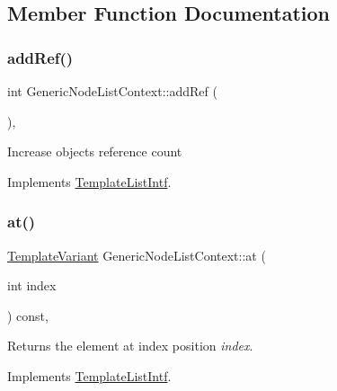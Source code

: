 \subsection{Member Function Documentation}
\mbox{\label{class_generic_node_list_context_a8c165d6443a3f2522cd6a871ce45ebc4}} 
\subsubsection{\texorpdfstring{addRef()}{addRef()}}
{\footnotesize\ttfamily int Generic\+Node\+List\+Context\+::add\+Ref (\begin{DoxyParamCaption}{ }\end{DoxyParamCaption})\hspace{0.3cm}{\ttfamily [inline]}, {\ttfamily [virtual]}}

Increase object\textquotesingle{}s reference count 

Implements \mbox{\hyperlink{class_template_list_intf_a4b4973e2e15396d10bc4e3085462ca2b}{Template\+List\+Intf}}.

\mbox{\label{class_generic_node_list_context_aa7d149964207236258937b46c4125cc7}} 
\subsubsection{\texorpdfstring{at()}{at()}}
{\footnotesize\ttfamily \mbox{\hyperlink{class_template_variant}{Template\+Variant}} Generic\+Node\+List\+Context\+::at (\begin{DoxyParamCaption}\item[{int}]{index }\end{DoxyParamCaption}) const\hspace{0.3cm}{\ttfamily [inline]}, {\ttfamily [virtual]}}

Returns the element at index position {\itshape index}. 

Implements \mbox{\hyperlink{class_template_list_intf_aa51e57e72eacf4e8ce1055ee30a0f7f8}{Template\+List\+Intf}}.

\mbox{\label{class_generic_node_list_context_ab1bacca5f270077592153af9ea296ebe}} 
